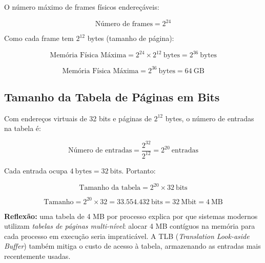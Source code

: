 \documentclass[12pt, a4paper]{article}
\begin{document}
O número máximo de frames físicos endereçáveis:

\[
  \text{Número de frames} = 2^{24}
\]

Como cada frame tem $2^{12}$ bytes (tamanho de página):

\[
  \text{Memória Física Máxima} = 2^{24} \times 2^{12}\ \text{bytes} = 2^{36}\ \text{bytes}
\]

\begin{caixaazul}
  \[
    \boxed{\text{Memória Física Máxima} = 2^{36}\ \text{bytes} = 64\ \mathrm{GB}}
  \]
\end{caixaazul}

\subsection{Tamanho da Tabela de Páginas em Bits}

Com endereços virtuais de 32 bits e páginas de $2^{12}$ bytes, o número de entradas
na tabela é:

\[
  \text{Número de entradas} = \frac{2^{32}}{2^{12}} = 2^{20}\ \text{entradas}
\]

Cada entrada ocupa $4\ \text{bytes} = 32\ \text{bits}$. Portanto:

\[
  \text{Tamanho da tabela} = 2^{20} \times 32\ \text{bits}
\]

\begin{caixaazul}
  \[
    \boxed{\text{Tamanho} = 2^{20} \times 32 = 33{.}554{.}432\ \text{bits}
           = 32\ \text{Mbit} = 4\ \text{MB}}
  \]
\end{caixaazul}

\begin{caixaamarela}
  \textbf{Reflexão:} uma tabela de 4 MB por processo explica por que sistemas
  modernos utilizam \emph{tabelas de páginas multi-nível}: alocar 4 MB
  contíguos na memória para cada processo em execução seria impraticável.
  A TLB (\emph{Translation Look-aside Buffer}) também mitiga o custo de acesso
  à tabela, armazenando as entradas mais recentemente usadas.
\end{caixaamarela}
\end{document}
